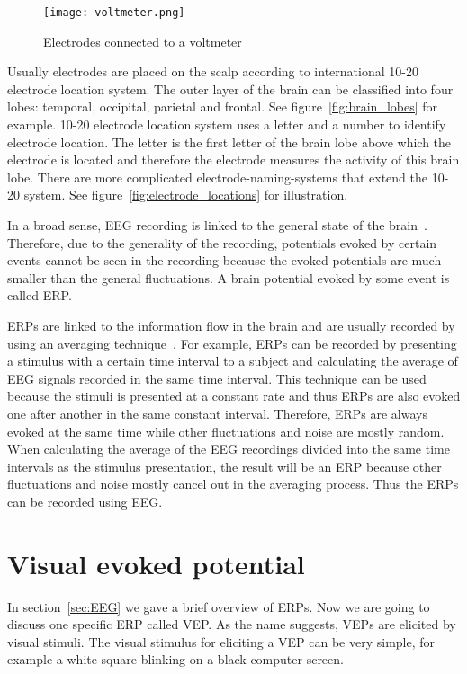 \begin{figure}[h!]
	\centering
	\texttt{[image: voltmeter.png]}
	\caption{Electrodes connected to a voltmeter~\cite[p.~120]{ERP}}
	\label{fig:voltmeter}
\end{figure}

Usually electrodes are placed on the scalp according to international 10-20 electrode location system. The outer layer of the brain can be classified into four lobes: temporal, occipital, parietal and frontal. See figure~\ref{fig:brain_lobes} for example. 10-20 electrode location system uses a letter and a number to identify electrode location. The letter is the first letter of the brain lobe above which the electrode is located and therefore the electrode measures the activity of this brain lobe. There are more complicated electrode-naming-systems that extend the 10-20 system. See figure~\ref{fig:electrode_locations} for illustration.

In a broad sense, \gls{EEG} recording is linked to the general state of the brain~\cite{VEP}. Therefore, due to the generality of the recording, potentials evoked by certain events cannot be seen in the recording because the evoked potentials are much smaller than the general fluctuations. A brain potential evoked by some event is called \gls{ERP}. 

\glspl{ERP} are linked to the information flow in the brain and are usually recorded by using an averaging technique~\cite{ERP}. For example, \glspl{ERP} can be recorded by presenting a stimulus with a certain time interval to a subject and calculating the average of \gls{EEG} signals recorded in the same time interval. This technique can be used because the stimuli is presented at a constant rate and thus \glspl{ERP} are also evoked one after another in the same constant interval. Therefore, \glspl{ERP} are always evoked at the same time while other fluctuations and noise are mostly random. When calculating the average of the \gls{EEG} recordings divided into the same time intervals as the stimulus presentation, the result will be an \gls{ERP} because other fluctuations and noise mostly cancel out in the averaging process. Thus the \glspl{ERP} can be recorded using \gls{EEG}. 

\section{Visual evoked potential}
\label{sec:VEP}

In section~\ref{sec:EEG} we gave a brief overview of \glspl{ERP}. Now we are going to discuss one specific \gls{ERP} called \gls{VEP}. As the name suggests, \glspl{VEP} are elicited by visual stimuli. The visual stimulus for eliciting a \gls{VEP} can be very simple, for example a white square blinking on a black computer screen.

